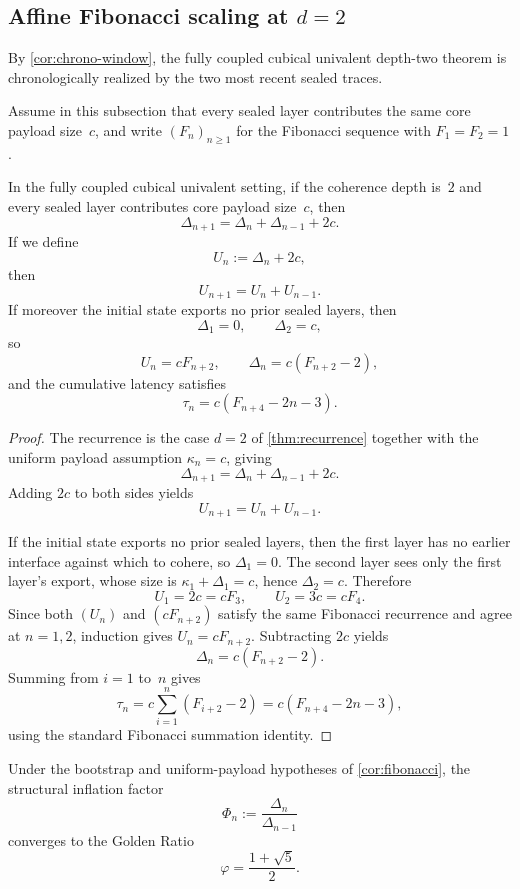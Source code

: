 \documentclass{lmcs}
\begin{document}
\subsection{\texorpdfstring{Affine Fibonacci scaling at $d=2$}{Affine Fibonacci scaling at d=2}}

By \autoref{cor:chrono-window}, the fully coupled cubical univalent depth-two theorem is chronologically realized by the two most recent sealed traces.

Assume in this subsection that every sealed layer contributes the same core payload size~$c$, and write $(F_n)_{n \geq 1}$ for the Fibonacci sequence with $F_1=F_2=1$.

\begin{cor}
\label{cor:fibonacci}
In the fully coupled cubical univalent setting, if the coherence depth is~$2$ and every sealed layer contributes core payload size~$c$, then
\[
  \Delta_{n+1} = \Delta_n + \Delta_{n-1} + 2c.
\]
If we define
\[
  U_n := \Delta_n + 2c,
\]
then
\[
  U_{n+1} = U_n + U_{n-1}.
\]
If moreover the initial state exports no prior sealed layers, then
\[
  \Delta_1 = 0,
  \qquad
  \Delta_2 = c,
\]
so
\[
  U_n = cF_{n+2},
  \qquad
  \Delta_n = c(F_{n+2}-2),
\]
and the cumulative latency satisfies
\[
  \tau_n = c(F_{n+4}-2n-3).
\]
\end{cor}

\begin{proof}
The recurrence is the case $d=2$ of \autoref{thm:recurrence} together with the uniform payload assumption $\kappa_n=c$, giving
\[
  \Delta_{n+1} = \Delta_n + \Delta_{n-1} + 2c.
\]
Adding $2c$ to both sides yields
\[
  U_{n+1} = U_n + U_{n-1}.
\]

If the initial state exports no prior sealed layers, then the first layer has no earlier interface against which to cohere, so $\Delta_1=0$. The second layer sees only the first layer's export, whose size is $\kappa_1+\Delta_1=c$, hence $\Delta_2=c$. Therefore
\[
  U_1 = 2c = cF_3,
  \qquad
  U_2 = 3c = cF_4.
\]
Since both $(U_n)$ and $(cF_{n+2})$ satisfy the same Fibonacci recurrence and agree at $n=1,2$, induction gives $U_n=cF_{n+2}$. Subtracting $2c$ yields
\[
  \Delta_n = c(F_{n+2}-2).
\]
Summing from $i=1$ to~$n$ gives
\[
  \tau_n
  =
  c\sum_{i=1}^n (F_{i+2}-2)
  =
  c(F_{n+4}-2n-3),
\]
using the standard Fibonacci summation identity.
\end{proof}

\begin{cor}
\label{cor:phi}
Under the bootstrap and uniform-payload hypotheses of \autoref{cor:fibonacci}, the structural inflation factor
\[
  \Phi_n := \frac{\Delta_n}{\Delta_{n-1}}
\]
converges to the Golden Ratio
\[
  \varphi = \frac{1+\sqrt{5}}{2}.
\]
\end{cor}
\end{document}
